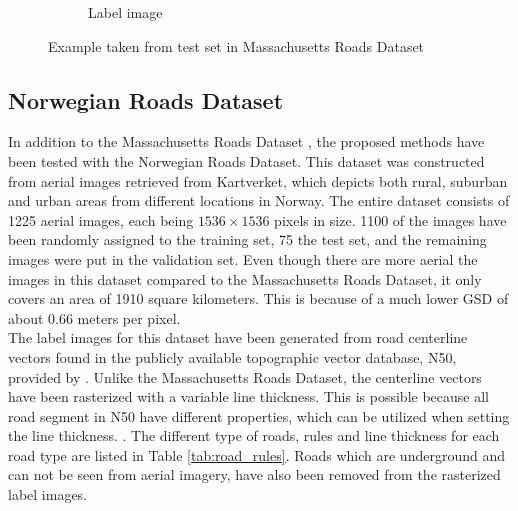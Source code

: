 \begin{figure}
\begin{subfigure}{0.48\textwidth}
\caption{Label image} \label{fig:mass_roads_example_label}
\end{subfigure}
\hspace*{\fill} %
\caption{Example taken from test set in Massachusetts Roads Dataset} \label{fig:mass_roads_example}
\end{figure}





\subsection{Norwegian Roads Dataset}
In addition to the Massachusetts Roads Dataset \citep{MnihThesis}, the proposed methods have been tested with the Norwegian Roads Dataset. This dataset was constructed from aerial images retrieved from Kartverket, which depicts both rural, suburban and urban areas from different locations in Norway. The entire dataset consists of 1225 aerial images, each being $1536\times 1536$ pixels in size. 1100 of the images have been randomly assigned to the training set, 75 the test set, and the remaining images were put in the validation set. Even though there are more aerial the images in this dataset compared to the Massachusetts Roads Dataset, it only covers an area of 1910 square kilometers. This is because of a much lower \ac{GSD} of about 0.66 meters per pixel. \\


The label images for this dataset have been generated from road centerline vectors found in the publicly available topographic vector database, N50, provided by \cite{Kartverket}. Unlike the Massachusetts Roads Dataset, the centerline vectors have been rasterized with a variable line thickness. This is possible because all road segment in N50 have different properties, which can be utilized when setting the line thickness. . The different type of roads, rules and line thickness for each road type are listed in Table \ref{tab:road_rules}. Roads which are underground and can not be seen from aerial imagery, have also been removed from the rasterized label images. \\

